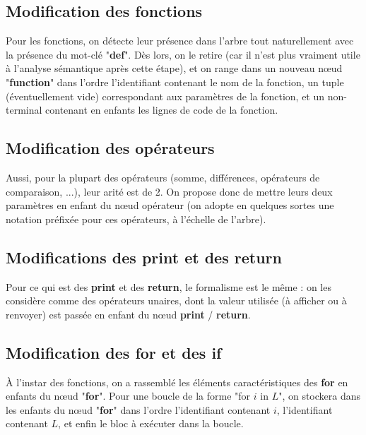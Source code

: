 \documentclass[a4paper, 12pt]{report}
\begin{document}
\subsection{Modification des fonctions}

Pour les fonctions, on détecte leur présence dans l'arbre tout naturellement avec la présence du mot-clé "\textbf{def}". Dès lors, on le retire (car il n'est plus vraiment utile à l'analyse sémantique après cette étape), et on range dans un nouveau n{\oe}ud "\textbf{function}" dans l'ordre l'identifiant contenant le nom de la fonction, un tuple (éventuellement vide) correspondant aux paramètres de la fonction, et un non-terminal contenant en enfants les lignes de code de la fonction.\\

\subsection{Modification des opérateurs}

Aussi, pour la plupart des opérateurs (somme, différences, opérateurs de comparaison, ...), leur arité est de 2. On propose donc de mettre leurs deux paramètres en enfant du n{\oe}ud opérateur (on adopte en quelques sortes une notation préfixée pour ces opérateurs, à l'échelle de l'arbre).\\

\subsection{Modifications des \textbf{print} et des \textbf{return}}

Pour ce qui est des \textbf{print} et des \textbf{return}, le formalisme est le même : on les considère comme des opérateurs unaires, dont la valeur utilisée (à afficher ou à renvoyer) est passée en enfant du n{\oe}ud \textbf{print} / \textbf{return}.\\

\subsection{Modification des \textbf{for} et des \textbf{if}}

À l'instar des fonctions, on a rassemblé les éléments caractéristiques des \textbf{for} en enfants du n{\oe}ud "\textbf{for}". Pour une boucle de la forme "for $i$ in $L$", on stockera dans les enfants du n{\oe}ud "\textbf{for}" dans l'ordre l'identifiant contenant $i$, l'identifiant contenant $L$, et enfin le bloc à exécuter dans la boucle.\\
\end{document}
